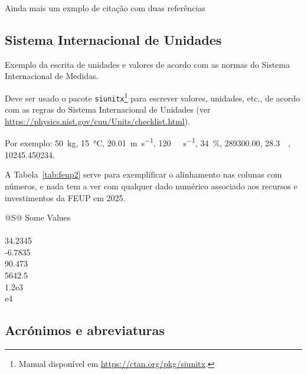 Ainda mais um exmplo de citação com duas referências~\parencite{iso_19156_2011,ornelas2016} 
\lipsum[5]

\subsection*{Sistema Internacional de Unidades} \label{sec:siu}

\begin{info}
Exemplo da escrita de unidades e valores de acordo com as normas do 
Sistema Internacional de Medidas.
\end{info}

Deve ser usado o pacote \texttt{siunitx}\footnote{Manual disponível em 
\url{https://ctan.org/pkg/siunitx}.} para escrever valores, unidades, etc., 
de acordo com as regras do Sistema Internacional de Unidades 
(ver \url{https://physics.nist.gov/cuu/Units/checklist.html}). 

Por exemplo:
\SI{50}{\kilo\gram}, 
\SI{15}{\celsius}, 
\SI{20,01}{\meter\per\second}, 
\SI{120}{\kilo\byte\per\second}, 
\SI{34}{\percent}, 
\SI{289300.00}{\eurocurrency}, 
\SI{28.3}{\mega\eurocurrency}, 
\num{10245.450234}.

A Tabela~\ref{tab:feup2} %
serve para exemplificar o alinhamento nas colunas com números, e nada tem a ver com qualquer dado numérico associado aos recursos e investimentos da \acs*{FEUP} em 2025.

\begin{table}
  \centering
  \caption[Physical Resources of \acs*{FEUP}]{Physical Resources of \acs*{FEUP}~\parencite{kn:feup}.}
  \begin{tabular}{@{}S@{}}
    \toprule
    {Some Values} \\
     \\
    34.2345 \\
    -6.7835 \\
    90.473 \\
    5642.5 \\
    1.2e3 \\
    e4 \\
    \bottomrule
  \end{tabular}
  \label{tab:feup2}
\end{table}

\lipsum[6]

\subsection*{Acrónimos e abreviaturas} \label{sec:acronym}

